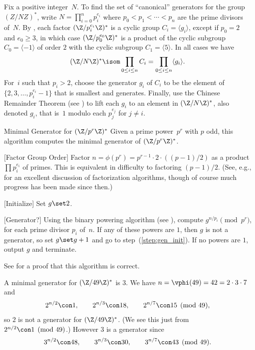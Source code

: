 Fix a positive integer~$N$.  To find the set of ``canonical''
generators for the group $(Z/NZ)^*$, write $N=\prod_{i=0}^{n}
{p_i^{e_i}}$ where $p_0<p_1<\cdots < p_n$ are the prime divisors
of~$N$.  By , each factor
$(\Z/p_i^{e_i}\Z)^*$ is a cyclic group $C_i=\langle g_i \rangle$,
except if $p_0=2$ and $e_0\geq 3$, in which case $(\Z/p_0^{e_0}\Z)^*$
is a product of the cyclic subgroup $C_0 = \langle -1 \rangle$ of
order $2$ with the cyclic subgroup $C_1 = \langle 5\rangle$.  In all
cases we have 
$$ 
(\Z/N\Z)^* \isom \prod_{0\leq i\leq n} C_i =
\prod_{0\leq i \leq n} \langle g_i \rangle.
$$
For~$i$ such that $p_i>2$, choose the generator $g_i$ of $C_i$ to be
the element of $\{2,3,\ldots, p_i^{e_i}-1\}$ that is smallest and
generates.  Finally, use the Chinese Remainder Theorem (see
\cite[\S1.3.3]{cohen:course_ant}) to lift each $g_i$ to an element in
$(\Z/N\Z)^*$, also denoted $g_i$, that is~$1$ modulo each $p_j^{e_j}$
for $j\neq i$.

\begin{algorithm}{Minimal Generator for $(\Z/p^r\Z)^*$}\label{alg:mingens}
Given a prime power~$p^r$ with $p$ odd, this algorithm computes
the minimal generator of $(\Z/p^r\Z)^*$.
\begin{steps}
\item{}[Factor Group Order] Factor $n=\phi(p^r) = p^{r-1}\cdot 2\cdot
  ((p-1)/2)$ as a product $\prod p_i^{e_i}$ of primes.  This is
  equivalent in difficulty to factoring $(p-1)/2$.  (See, e.g.,
  \cite[Ch.8, Ch.~10]{cohen:course_ant} for an excellent discussion of 
  factorization algorithms, though of course much progress has been
  made since then.)
\item{}[Initialize]\label{step:gen_init} Set $g\set 2$.  
\item{}[Generator?] Using the binary powering algorithm (see
  \cite[\S1.2]{cohen:course_ant}), compute $g^{n/p_i}\pmod{p^r}$, for
  each prime divisor $p_i$ of~$n$.  If any of these powers are $1$,
then $g$ is not a generator, so
  set $g\set g+1$ and go to step~(\ref{step:gen_init}). 
If no powers are $1$, output $g$ and terminate.
\end{steps}
\end{algorithm}
See  for a proof that this
algorithm is correct.

\begin{example}
A minimal generator for $(\Z/49\Z)^*$ is $3$.  
We have $n=\vphi(49)=42=2\cdot 3\cdot 7$ and 
$$
  2^{n/2} \con 1, \qquad 2^{n/3} \con 18, \qquad 2^{n/7} \con 15 \pmod{49},
$$
so $2$ is not a generator for $(\Z/49\Z)^*$.  (We see
this just from $2^{n/2}\con 1\pmod{49}$.)  However $3$ is 
a generator since
$$
  3^{n/2} \con 48, \qquad 3^{n/3} \con 30, \qquad 3^{n/7} \con 43 \pmod{49}.
$$
\end{example}

